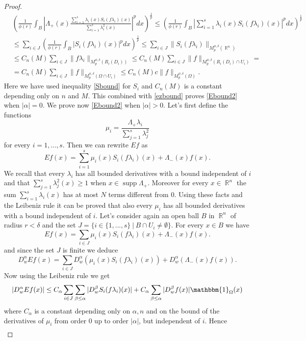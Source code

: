 \documentclass[12pt]{article}
\theoremstyle{definition}
\DeclareMathOperator\supp{supp}
\DeclareMathOperator\rr{\mathbb{R}}
\begin{document}
\begin{proof}
\begin{align*}
&\left( \frac{1}{\phi(r)} \int_B \left|\Lambda_+(x) \frac{\sum_{i=1}^s \lambda_i(x)S_i(f\lambda_i)(x)}{\sum_{i=1}^s \lambda_i^2(x)}\right|^pdx \right)^\frac{1}{p}\le   \left( \frac{1}{\phi(r)} \int_{B}|\sum_{i=1}^s \lambda_i(x)S_i(f\lambda_i)(x)|^pdx \right)^\frac{1}{p} \\
& \le  \sum_{i\in J}  \left( \frac{1}{\phi(r)} \int_{B} |S_i(f\lambda_i)(x)|^pdx \right)^\frac{1}{p} \le \sum_{i\in J} \| S_i(f\lambda_i)\|_{M_p^{\phi,\delta}(\rr^n)} \\
& \le C_n(M) \sum_{i\in J} \| f\lambda_i\|_{M_p^{\phi,\delta}(R_i(D_i))} \le C_n(M) \sum_{i\in J} \| f\|_{M_p^{\phi,\delta}(R_i(D_i)\cap U_i)}=\\
&= C_n(M)\sum_{i\in J} \| f\|_{M_p^{\phi,\delta}(\Omega \cap U_i)} \le C_n(M) c\| f\|_{M_p^{\phi,\delta}(\Omega )}.
\end{align*}
Here we have used inequality \eqref{Sbound} for $S_i$ and $C_n(M)$ is a constant depending only on $n$ and $M$. This combined with \eqref{ezbound} proves \eqref{Ebound2} when $|\alpha|=0.$ We prove now \eqref{Ebound2} when $|\alpha|>0.$ Let's first define the functions
\[ \mu_i=\frac{\Lambda_+\lambda_i}{\sum_{j=1}^s\lambda^2_j}\]
for every $i=1,...,s.$ Then we can rewrite $Ef$ as
\[ Ef(x)=\sum_{i=1}^s \mu_i(x)S_i(f\lambda_i)(x)+\Lambda_-(x)f(x).\]
We recall that every $\lambda_i$ has all bounded derivatives with a bound independent of $i$ and that $\sum_{j=1}^s\lambda^2_j(x)\ge 1$ when $x \in \supp \Lambda_+.$ Moreover for every $x\in \rr^n$ the sum $\sum_{i=1}^s\lambda_i(x)$ has at most $N$ terms different from $0$. Using these facts and the Leibeniz rule it can be proved that also every $\mu_i$ has all bounded derivatives with a bound independent of $i$. Let's consider again an open ball $B$ in $\rr^n$ of radius $r<\delta$ and the set $J=\{i \in \{1,...,s\} \ | \ B\cap U_i \neq \emptyset\}$. For every $x \in B$ we have
\[ Ef(x)=\sum_{i \in J} \mu_i(x)S_i(f\lambda_i)(x)+\Lambda_-(x)f(x).\]
and since the set $J$ is finite we deduce
\[ D^\alpha_wEf(x)=\sum_{i \in J} D^\alpha_w(\mu_i(x)S_i(f\lambda_i)(x))+D^\alpha_w(\Lambda_-(x)f(x)).\]
Now using the Leibeniz rule we get
\[ |D^\alpha_wEf(x)|\le C_\alpha\sum_{i \in J} \sum_{\beta\le \alpha} |D^\beta_wS_i(f\lambda_i)(x)|+C_\alpha\sum_{\beta\le \alpha} |D^\beta_w f(x)|\mathbbm{1}_\Omega(x)\]
where $C_\alpha$ is a constant depending only on $\alpha,n$ and on the bound of the derivatives of $\mu_i$ from order 0 up to order $|\alpha|$, but independent of $i.$ Hence 
\begin{align*}

\end{align*}
\end{proof}
\end{document}

